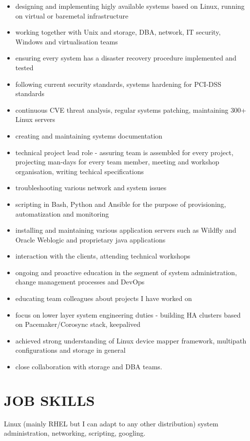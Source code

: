 \documentclass{cv}
\begin{document}
\begin{itemize}
    \setlength\itemsep{0.1cm}
    \item designing and implementing higly available systems based on Linux, running on virtual or baremetal infrastructure
    \item working together with Unix and storage, DBA, network, IT security, Windows and virtualisation teams 
    \item ensuring every system has a disaster recovery procedure implemented and tested
    \item following current security standards, systems hardening for PCI-DSS standards
    \item continuous CVE threat analysis, regular systems patching, maintaining 300+ Linux servers
    \item creating and maintaining systems documentation
    \item technical project lead role - assuring team is assembled for every project, projecting man-days for every team member, meeting and workshop organisation, writing techical specifications
    \item troubleshooting various network and system issues 
    \item scripting in Bash, Python and Ansible for the purpose of provisioning, automatization and monitoring
    \item installing and maintaining various application servers such as Wildfly and Oracle Weblogic and proprietary java applications
    \item interaction with the clients, attending technical workshops
    \item ongoing and proactive education in the segment of system administration, change management processes and DevOps
    \item educating team colleagues about projects I have worked on
    \item focus on lower layer system engineering duties - building HA clusters based on Pacemaker/Corosync stack, keepalived 
    \item achieved strong understanding of Linux device mapper framework, multipath configurations and storage in general
    \item close collaboration with storage and DBA teams.
\end{itemize}
\section{JOB SKILLS}
Linux (mainly RHEL but I can adapt to any other distribution) system administration, networking, scripting, googling.
\end{document}
